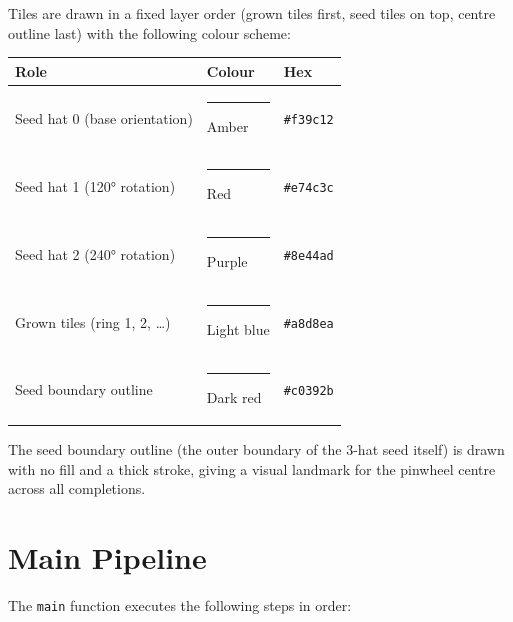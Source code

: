 \documentclass[10pt,a4paper]{article}
\let\polysection\section
\renewcommand\section{\needspace{0.16\textheight}\polysection}
\newcommand{\code}[1]{\texttt{\small #1}}
\begin{document}
Tiles are drawn in a fixed layer order (grown tiles first, seed tiles on top,
centre outline last) with the following colour scheme:

\medskip
\begin{tabular}{@{}lll@{}}
\toprule
\textbf{Role} & \textbf{Colour} & \textbf{Hex} \\
\midrule
Seed hat 0 (base orientation)  & {\color{seedorange}\rule{1em}{0.8em}} Amber   & \texttt{\#f39c12} \\
Seed hat 1 (120° rotation)     & {\color{seedred}\rule{1em}{0.8em}} Red     & \texttt{\#e74c3c} \\
Seed hat 2 (240° rotation)     & {\color{seedpurple}\rule{1em}{0.8em}} Purple  & \texttt{\#8e44ad} \\
Grown tiles (ring 1, 2, \ldots) & {\color{grownblue}\rule{1em}{0.8em}} Light blue & \texttt{\#a8d8ea} \\
Seed boundary outline          & {\color{centerred}\rule{1em}{0.8em}} Dark red & \texttt{\#c0392b} \\
\bottomrule
\end{tabular}

\medskip
\noindent The seed boundary outline (the outer boundary of the 3-hat
seed itself) is drawn with no fill and a thick stroke, giving a visual
landmark for the pinwheel centre across all completions.

\section{Main Pipeline}

The \code{main} function executes the following steps in order:
\end{document}
